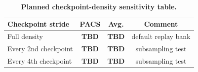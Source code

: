 \documentclass{article}
\newcommand{\TBD}{\textbf{TBD}}
\begin{document}
\begin{table}[H]
    \centering
    \small
    \caption{\textbf{Planned checkpoint-density sensitivity table.}}
    \label{tab:density_tbd}
    \begin{tabular}{lccc}
        \toprule
        Checkpoint stride & PACS & Avg. & Comment \\
        \midrule
        Full density & \TBD & \TBD & default replay bank \\
        Every 2nd checkpoint & \TBD & \TBD & subsampling test \\
        Every 4th checkpoint & \TBD & \TBD & subsampling test \\
        \bottomrule
    \end{tabular}
\end{table}
\end{document}
